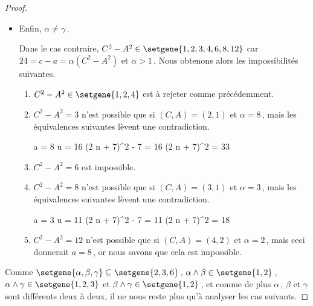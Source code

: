 \begin{proof}
\begin{itemize}
		\item Enfin, $\alpha \neq \gamma$\,. 
		
		\noindent
		Dans le cas contraire,
		$C^2 - A^2 \in \setgene{1, 2, 3, 4, 6, 8, 12}$
		car 
		$24 = c - a = \alpha(C^2 - A^2)$ et $\alpha > 1$\,.
		Nous obtenons alors les impossibilités suivantes.
		\begin{enumerate}
			\item $C^2 - A^2 \in \setgene{1, 2, 4}$ est à rejeter comme précédemment.
			
			\item $C^2 - A^2 = 3$ n'est possible que si $(C, A) = (2, 1)$ et $\alpha = 8$\,, mais les équivalences suivantes lèvent une contradiction.

    		\smallskip
    		\noindent\!\!%
       		\begin{stepcalc}[style = sar, ope = \iff]
    			a = 8
    		\explnext{}
    			u = 16
    		\explnext{}
    			(2 n + 7)^2 - 7 = 16
    		\explnext*{$33 \notin \NNsquare$}{}
    			(2 n + 7)^2 = 33
    		\end{stepcalc}	
			\smallskip
	
			\item $C^2 - A^2 = 6$ est impossible.
			
			\item $C^2 - A^2 = 8$ n'est possible que si $(C, A) = (3, 1)$ et $\alpha = 3$\,, mais les équivalences suivantes lèvent une contradiction.

    		\smallskip
    		\noindent\!\!%
       		\begin{stepcalc}[style = sar, ope = \iff]
    			a = 3
    		\explnext{}
    			u = 11
    		\explnext{}
    			(2 n + 7)^2 - 7 = 11
    		\explnext*{$18 \notin \NNsquare$}{}
    			(2 n + 7)^2 = 18
    		\end{stepcalc}	
			\smallskip
			
			
			\item $C^2 - A^2 = 12$ n'est possible que si $(C, A) = (4, 2)$ et $\alpha = 2$\,, mais ceci donnerait $a = 8$\,, or nous savons que cela est impossible.
		\end{enumerate}
	\end{itemize}


	Comme
	$\setgene{\alpha, \beta, \gamma} \subseteq \setgene{2, 3, 6}$\,,
	$\alpha \wedge \beta \in \setgene{1, 2}$\,,
	$\alpha \wedge \gamma \in \setgene{1, 2, 3}$ et
	$\beta \wedge \gamma \in \setgene{1, 2}$\,,
	et comme de plus $\alpha$\,, $\beta$ et $\gamma$ sont différents deux à deux, il ne nous reste plus qu'à analyser les cas suivants.


\end{proof}
